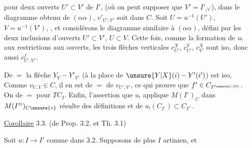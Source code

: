 
pour deux ouverts $U'\subset V'$ de $I'$,  (où on peut supposer que $V'=I'_{/i'}$), dans le diagramme obtenu de $(\alpha\alpha)$, $v'_{U',V'}$ soit dans $C$. Soit $U=u^{-1}(U')$, $V=u^{-1}(V')$, , et considérons le diagramme similaire à $(\alpha\alpha)$, défini par les deux inclusions d'ouverts $U'\subset V'$, $U\subset V$. Cette fois, comme la formation de $u_!$  aux restrictions aux ouverts,  les trois flèches verticales $c^X_{U'}$, $c^Y_{U'}$, $c^X_{V'}$ sont iso, donc aussi $c^f_{U',V'}$.

De $=$ la flèche $Y_V\mathbin{-}Y'_{V'}$ (à la place de $\unsure{Y|X}(i)\mathbin{-}Y'(i')$) est iso, Comme $v_{U,V}\in C$, il en est de $=$ de $v_{U',V'}$, ce qui prouve que $f'\in C_{I'^{\unsure{\circ|0}}}$.  On  de $=$ pour $TC_I$. Enfin, l'assertion que $u_!$ applique $M(I^\circ)_C$ dans $M(I'^\circ)_{C\unsure{*}}$ résulte des  définitions et de $u_!(C_{I^\circ})\subset C_{I'^\circ}$.

\uline{Corollaire} 3.3. (de Prop. 3.2. et Th. 3.1)

Soit $u:I\longrightarrow I'$ comme dans 3.2. Supposons de plus $I$  artinien, et
